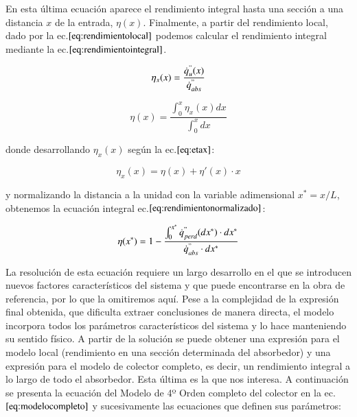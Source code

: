 \documentclass[12pt]{report} %
\begin{document}
En esta última ecuación aparece el rendimiento integral hasta una sección a una distancia \(x\) de la entrada, \(\eta(x)\). Finalmente, a partir del rendimiento local, dado por la ec.\(\eqref{eq:rendimientolocal}\) podemos calcular el rendimiento integral mediante la ec.\(\eqref{eq:rendimientointegral}\).

\begin{equation}
    \eta_{x}(x) = \frac{\dot{q}^{"}_{u}(x)}{\dot{q}^{"}_{abs}} \label{eq:rendimientolocal}
\end{equation}

\begin{equation}
    \eta(x) = \frac{\int_{0}^{x}\eta_{x}(x)dx}{\int_{0}^{x}dx} \label{eq:rendimientointegral}
\end{equation}

donde desarrollando \(\eta_{x}(x)\) según la ec.\(\eqref{eq:etax}\):

\begin{equation}
    \eta_{x}(x) = \eta(x) + \eta'(x)\cdot x  \label{eq:etax}
\end{equation}

y normalizando la distancia a la unidad con la variable adimensional \(x^{*}=x/L\), obtenemos la ecuación integral ec.\(\eqref{eq:rendimientonormalizado}\):

\begin{equation}
    \eta(x^{*}) = 1 - \frac{\int_{0}^{x^{*}} \dot{q}^{"}_{perd}(dx^{*})\cdot dx^{*}}{\dot{q}^{"}_{abs}\cdot dx^{*}} \label{eq:rendimientonormalizado}
\end{equation}

La resolución de esta ecuación requiere un largo desarrollo en el que se introducen nuevos factores característicos del sistema y que puede encontrarse en la obra de referencia, por lo que la omitiremos aquí. Pese a la complejidad de la expresión final obtenida, que dificulta extraer conclusiones de manera directa, el modelo incorpora todos los parámetros característicos del sistema y lo hace manteniendo su sentido físico. A partir de la solución se puede obtener una expresión para el modelo local (rendimiento en una sección determinada del absorbedor) y una expresión para el modelo de colector completo, es decir, un rendimiento integral a lo largo de todo el absorbedor. Esta última es la que nos interesa. A continuación se presenta la ecuación del Modelo de 4º Orden completo del colector en la ec.\(\eqref{eq:modelocompleto}\) y sucesivamente las ecuaciones que definen sus parámetros:
\end{document}
